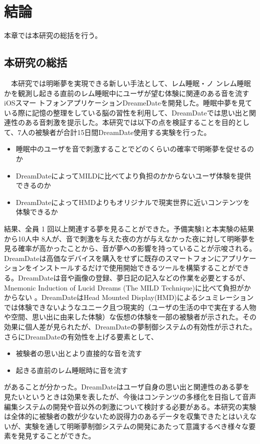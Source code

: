 \chapter{結論}
\label{chap:coding}

本章では本研究の総括を行う。
\section{本研究の総括}
　本研究では明晰夢を実現できる新しい手法として、レム睡眠・ノ ンレム睡眠かを観測し起きる直前のレム睡眠中にユーザが望む体験に関連のある音を流すiOSスマー トフォンアプリケーションDreameDateを開発した。睡眠中夢を見ている際に記憶の整理をしている脳の習性を利用して、DreamDateでは思い出と関連性のある音刺激を提示した。本研究では以下の点を検証することを目的として、7人の被験者が合計15日間DreamDate使用する実験を行った。
\begin{itemize}
\item 睡眠中のユーザを音で刺激することでどのくらいの確率で明晰夢を促せるのか
\item DreamDateによってMILDに比べてより負担のかからないユーザ体験を提供できるのか
\item DreamDateによってHMDよりもオリジナルで現実世界に近いコンテンツを体験できるか
\end{itemize}

結果、全員 1 回以上関連する夢を見ることができた。予備実験1と本実験の結果から10人中 8人が、音で刺激を与えた夜の方が与えなかった夜に対して明晰夢を見る確率が高かったことから、音が夢への影響を持っていることが示唆される。DreamDateは高価なデバイスを購入をせずに既存のスマートフォンにアプリケーションをインストールするだけで使用開始できるツールを構築することができる。DreamDateは音や画像の登録、夢日記の記入などの作業を必要とするが、Mnemonic Induction of Lucid Dreams (The MILD Technique)に比べて負担がかからない\cite{LaBerge} 。DreamDateはHead Mounted Display(HMD)によるシュミレーションでは体験できないようなユニーク且つ現実的（ユーザの生活の中で実在する人物や空間、思い出に由来した体験）な仮想の体験を一部の被験者が示された。その効果に個人差が見られたが、DreamDateの夢制御システムの有効性が示された。さらにDreamDateの有効性を上げる要素として、

\begin{itemize}
\item 被験者の思い出とより直接的な音を流す
\item 起きる直前のレム睡眠時に音を流す
\end{itemize}

があることが分かった。DreamDateはユーザ自身の思い出と関連性のある夢を見たいというときは効果を表したが、今後はコンテンツの多様化を目指して音声編集システムの開発や音以外の刺激について検討する必要がある。本研究の実験は全体的に被験者の数が少ないため説得力のあるデータを収集できたとはいえないが、実験を通して明晰夢制御システムの開発にあたって意識するべき様々な要素を発見することができた。

